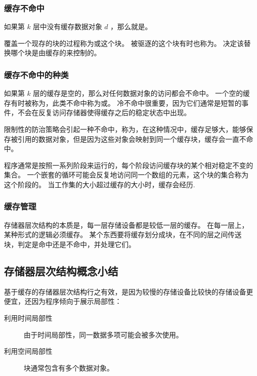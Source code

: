 {{        \subsubsection{缓存不命中}
        {
            如果第 $k$ 层中没有缓存数据对象 $d$ ，那么就是。

            覆盖一个现存的块的过程称为或这个块。
            被驱逐的这个块有时也称为。
            决定该替换哪个块是由缓存的来控制的。
        }

        \subsubsection{缓存不命中的种类}
        {
            如果第 $k$ 层的缓存是空的，那么对任何数据对象的访问都会不命中。
            一个空的缓存有时被称为，此类不命中称为或。
            冷不命中很重要，因为它们通常是短暂的事件，不会在反复访问存储器使得缓存之后的稳定状态中出现。

            限制性的防治策略会引起一种不命中，称为，在这种情况中，缓存足够大，能够保存被引用的数据对象，但是因为这些对象会映射到同一个缓存块，缓存会一直不命中。

            程序通常是按照一系列阶段来运行的，每个阶段访问缓存块的某个相对稳定不变的集合。
            一个嵌套的循环可能会反复地访问同一个数组的元素，这个块的集合称为这个阶段的。
            当工作集的大小超过缓存的大小时，缓存会经历.
        }

        \subsubsection{缓存管理}
        {
            存储器层次结构的本质是，每一层存储设备都是较低一层的缓存。
            在每一层上，某种形式的逻辑必须缓存。
            某个东西要将缓存划分成块，在不同的层之间传送块，判定是命中还是不命中，并处理它们。
        }
    }

    \subsection{存储器层次结构概念小结}
    {
        基于缓存的存储器层次结构行之有效，是因为较慢的存储设备比较快的存储设备更便宜，还因为程序倾向于展示局部性：

        \begin{description}
            \item[利用时间局部性] 由于时间局部性，同一数据多项可能会被多次使用。
            \item[利用空间局部性] 块通常包含有多个数据对象。
        \end{description}
    }
}
